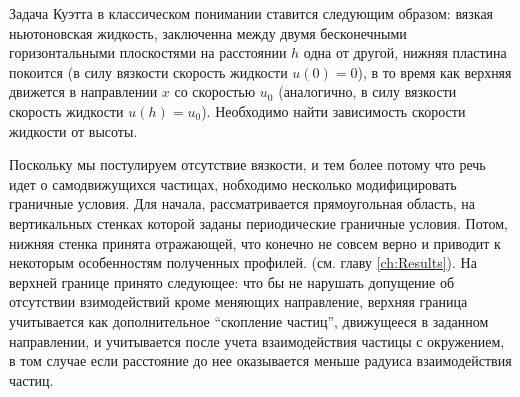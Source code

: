     Задача Куэтта в классическом понимании ставится следующим образом: вязкая ньютоновская жидкость, заключенна между двумя бесконечными горизонтальными плоскостями на расстоянии $h$ одна от другой, нижняя пластина покоится (в силу вязкости скорость жидкости $u(0) = 0$), в то время как верхняя движется в направлении $x$ со скоростью $u_0$ (аналогично, в силу вязкости скорость жидкости $u(h) = u_0$). Необходимо найти зависимость скорости жидкости от высоты.

    Поскольку мы постулируем отсутствие вязкости, и тем более потому что речь идет о самодвижущихся частицах, нобходимо несколько модифицировать граничные условия. Для начала, рассматривается прямоугольная область, на вертикальных стенках которой заданы периодические граничные условия. Потом, нижняя стенка принята отражающей, что конечно не совсем верно и приводит к некоторым особенностям полученных профилей. (см. главу \ref{ch:Results}). На верхней границе принято следующее: что бы не нарушать допущение об отсутствии взимодействий кроме меняющих направление, верхняя граница учитывается как дополнительное ``скопление частиц'', движущееся в заданном направлении, и учитывается после учета взаимодействия частицы с окружением, в том случае если расстояние до нее оказывается меньше радуиса взаимодействия частиц.
